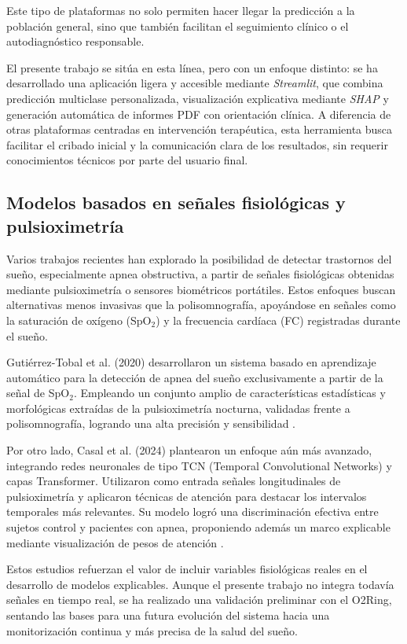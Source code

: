 Este tipo de plataformas no solo permiten hacer llegar la predicción a la población general, sino que también facilitan el seguimiento clínico o el autodiagnóstico responsable.

El presente trabajo se sitúa en esta línea, pero con un enfoque distinto: se ha desarrollado una aplicación ligera y accesible mediante \textit{Streamlit}, que combina predicción multiclase personalizada, visualización explicativa mediante \textit{SHAP} y generación automática de informes PDF con orientación clínica. A diferencia de otras plataformas centradas en intervención terapéutica, esta herramienta busca facilitar el cribado inicial y la comunicación clara de los resultados, sin requerir conocimientos técnicos por parte del usuario final.


\subsection{Modelos basados en señales fisiológicas y pulsioximetría}

Varios trabajos recientes han explorado la posibilidad de detectar trastornos del sueño, especialmente apnea obstructiva, a partir de señales fisiológicas obtenidas mediante pulsioximetría o sensores biométricos portátiles. Estos enfoques buscan alternativas menos invasivas que la polisomnografía, apoyándose en señales como la saturación de oxígeno (SpO$_2$) y la frecuencia cardíaca (FC) registradas durante el sueño.

Gutiérrez-Tobal et al. (2020) desarrollaron un sistema basado en aprendizaje automático para la detección de apnea del sueño exclusivamente a partir de la señal de SpO$_2$. Empleando un conjunto amplio de características estadísticas y morfológicas extraídas de la pulsioximetría nocturna, validadas frente a polisomnografía, logrando una alta precisión y sensibilidad \cite{gutierrez2020apnea}.


Por otro lado, Casal et al. (2024) plantearon un enfoque aún más avanzado, integrando redes neuronales de tipo TCN (Temporal Convolutional Networks) y capas Transformer. Utilizaron como entrada señales longitudinales de pulsioximetría y aplicaron técnicas de atención para destacar los intervalos temporales más relevantes. Su modelo logró una discriminación efectiva entre sujetos control y pacientes con apnea, proponiendo además un marco explicable mediante visualización de pesos de atención \cite{casal2021tcn}.

Estos estudios refuerzan el valor de incluir variables fisiológicas reales en el desarrollo de modelos explicables. Aunque el presente trabajo no integra todavía señales en tiempo real, se ha realizado una validación preliminar con el O2Ring, sentando las bases para una futura evolución del sistema hacia una monitorización continua y más precisa de la salud del sueño.

